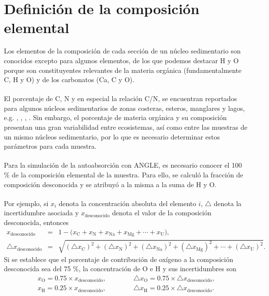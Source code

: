 	\section[Definición de la composición elemental]{Definición de la composición elemental}\label{Secc-100Composicion}
Los elementos de la composición de cada sección de un núcleo sedimentario son conocidos excepto para algunos elementos, de los que podemos destacar H y O porque son constituyentes relevantes de la materia orgánica (fundamentalmente C, H y O) y de los carbonatos (Ca, C y O).
\\
\\
El porcentaje de C, N y en especial la relación C/N, se encuentran reportados para  algunos núcleos sedimentarios de zonas costeras, esteros, manglares y lagos, e.g. \cite{ramanathan2010management}, \cite{BARDHAN201590}, \cite{DUNN20082535}, \cite{TUE201887}. Sin embargo, el porcentaje de materia orgánica y su composición presentan una gran variabilidad entre ecosistemas, así como entre las muestras de un mismo núcleos sedimentario, por lo que es necesario determinar estos parámetros para cada muestra.
\\
\\
Para la simulación de la autoabsorción con ANGLE, es necesario conocer el 100 \% de la composición elemental de la muestra. Para ello, se calculó la fracción de composición desconocida y se atribuyó a la misma a la suma de H y O. 
\\
\\
Por ejemplo, si $x_i$ denota la concentración absoluta del elemento $i$, $\bigtriangleup$ denota la incertidumbre asociada y $x_\text{desconocido}$ denota el valor de la composición desconocida, entonces 
\begin{eqnarray}
x_\text{desconocido} &=& 1 - \biggl( x_\text{C} + x_\text{N} +  x_\text{Na} + x_\text{Mg} + \cdots + x_\text{U} \biggr), \\
\bigtriangleup x_\text{desconocido} &=& \sqrt{ 
(\bigtriangleup x_\text{C})^2 +
(\bigtriangleup x_\text{N})^2 +
(\bigtriangleup x_\text{Na})^2 +
(\bigtriangleup x_\text{Mg})^2 +
\cdots +
(\bigtriangleup x_\text{U})^2 }.
\end{eqnarray}
Si se establece que el porcentaje de contribución de oxígeno a la composición desconocida sea del 75 \%, la concentración de O e H y sus incertidumbres son 
\begin{eqnarray}
x_\text{O} = 0.75\times x_\text{desconocido}, & \hspace{1cm} & \bigtriangleup x_\text{O} = 0.75\times \bigtriangleup x_\text{desconocido}, \\
x_\text{H} = 0.25\times x_\text{desconocido}, & \hspace{1cm} & \bigtriangleup x_\text{H} = 0.25\times \bigtriangleup x_\text{desconocido}.
\end{eqnarray}
